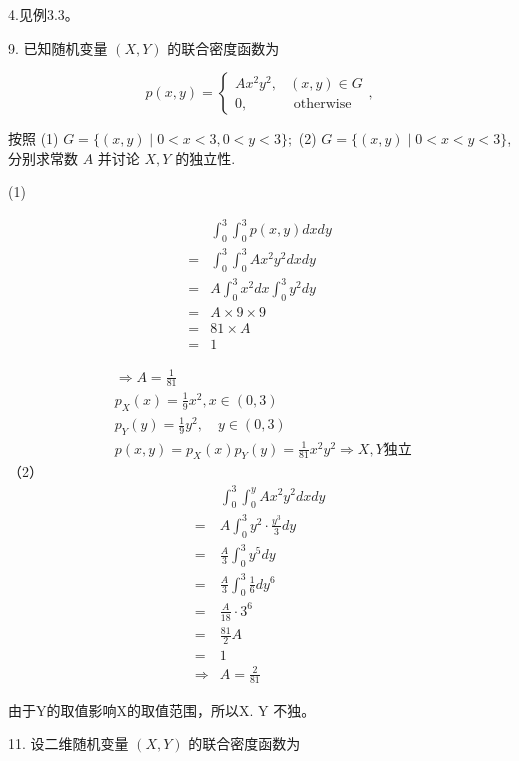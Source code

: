 \documentclass[14pt]{scrartcl} %
\numberwithin{equation}{section} %
\numberwithin{figure}{section} %
\numberwithin{table}{section} %
\begin{document}
	4.见例3.3。
	
	9. 已知随机变量 $(X, Y)$ 的联合密度函数为
	
	$$
	p(x, y)=\left\{\begin{array}{cc}
		A x^{2} y^{2}, & (x, y) \in G \\
		0, & \text { otherwise }
	\end{array},\right.
	$$
	
	按照 (1) $G=\{(x, y) \mid 0<x<3,0<y<3\} ;$ (2) $G=\{(x, y) \mid 0<x<y<3\}$, 分别求常数 $A$ 并讨论 $X, Y$ 的独立性.
	
	(1)
	
	$$
	\begin{aligned}
		& \int_{0}^{3} \int_{0}^{3} p(x, y) d x d y\\
		= &\int_{0}^{3} \int_{0}^{3} A x^{2} y^{2} d x d y \\
		= & A \int_{0}^{3} x^{2} d x \int_{0}^{3} y^{2} d y \\
		= & A \times 9 \times 9 \\
		= & 81 \times A \\
		= & 1
	\end{aligned}
	$$
	
	$$
	\begin{aligned}
		& \Rightarrow A=\frac{1}{81} \\
		& p_{X}(x)=\frac{1}{9} x^{2}, x \in(0,3) \\
		& p_{Y}(y)=\frac{1}{9} y^{2}, \quad y \in(0,3) \\
		& p(x, y)=p_{X}(x) p_{Y}(y)=\frac{1}{81} x^{2} y^{2} \Rightarrow X, Y \text {独立 }
	\end{aligned}
	$$
	（2）
	$$
	\begin{aligned}
		& \int_{0}^{3} \int_{0}^{y} A x^{2} y^{2} d x d y \\
		= & A \int_{0}^{3} y^{2} \cdot \frac{y^{3}}{3} d y \\
		= & \frac{A}{3} \int_{0}^{3} y^{5} d y \\
		= & \frac{A}{3} \int_{0}^{3} \frac{1}{6} d y^{6} \\
		= & \frac{A}{18} \cdot 3^{6} \\
		= & \frac{81}{2} A \\
		= & 1 \\
		\Rightarrow & A=\frac{2}{81}
	\end{aligned}
	$$
	
	由于Y的取值影响X的取值范围，所以X. Y 不独。
	
	11. 设二维随机变量 $(X, Y)$ 的联合密度函数为
	
\end{document}
